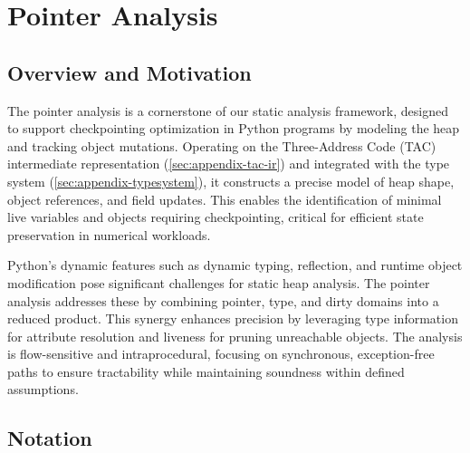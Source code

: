 \newpage

\section{Pointer Analysis}
\label{sec:appendix-pointer}

\subsection{Overview and Motivation}

The pointer analysis is a cornerstone of our static analysis framework, designed to support checkpointing optimization in Python programs by modeling the heap and tracking object mutations. Operating on the Three-Address Code (TAC) intermediate representation (\autoref{sec:appendix-tac-ir}) and integrated with the type system (\autoref{sec:appendix-typesystem}), it constructs a precise model of heap shape, object references, and field updates. This enables the identification of minimal live variables and objects requiring checkpointing, critical for efficient state preservation in numerical workloads.

Python’s dynamic features such as dynamic typing, reflection, and runtime object modification pose significant challenges for static heap analysis. The pointer analysis addresses these by combining pointer, type, and dirty domains into a reduced product. This synergy enhances precision by leveraging type information for attribute resolution and liveness for pruning unreachable objects. The analysis is flow-sensitive and intraprocedural, focusing on synchronous, exception-free paths to ensure tractability while maintaining soundness within defined assumptions.

\subsection{Notation}


